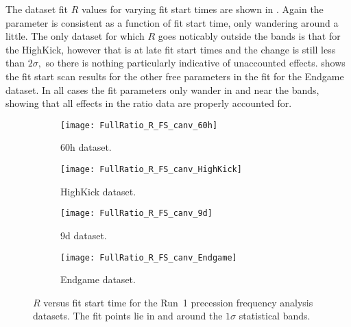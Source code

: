 The dataset fit $R$ values for varying fit start times are shown in . Again the parameter is consistent as a function of fit start time, only wandering around a little. The only dataset for which $R$ goes noticably outside the bands is that for the HighKick, however that is at late fit start times and the change is still less than $2\sigma,$ so there is nothing particularly indicative of unaccounted effects.  shows the fit start scan results for the other free parameters in the fit for the Endgame dataset. In all cases the fit parameters only wander in and near the bands, showing that all effects in the ratio data are properly accounted for.


\begin{figure}[]
\centering
    \begin{subfigure}[]{0.45\textwidth}
        \centering
        \texttt{[image: FullRatio\_R\_FS\_canv\_60h]}
        \caption{60h dataset.}
    \end{subfigure}%
    \begin{subfigure}[]{0.45\textwidth}
        \centering
        \texttt{[image: FullRatio\_R\_FS\_canv\_HighKick]}
        \caption{HighKick dataset.}
    \end{subfigure}

    \begin{subfigure}[]{0.45\textwidth}
        \centering
        \texttt{[image: FullRatio\_R\_FS\_canv\_9d]}
        \caption{9d dataset.}
    \end{subfigure}%
    \begin{subfigure}[]{0.45\textwidth}
        \centering
        \texttt{[image: FullRatio\_R\_FS\_canv\_Endgame]}
        \caption{Endgame dataset.}
    \end{subfigure}
\caption[$R$ versus fit start time]{$R$ versus fit start time for the Run~1 precession frequency analysis datasets. The fit points lie in and around the $1\sigma$ statistical bands.}
\label{fig:fitStartTime_R}
\end{figure}


